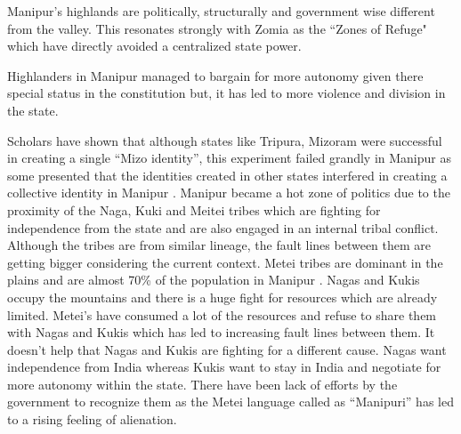 Manipur's highlands are politically, structurally and government wise different from the valley. This resonates strongly with Zomia as the ``Zones of Refuge" which have directly avoided a centralized state power.
\begin{sloppypar}

 Highlanders in Manipur managed to bargain for more autonomy given there special status in the constitution but, it has led to more violence and division in the state.
\end{sloppypar}
Scholars have shown that although states like Tripura, Mizoram were successful in creating a single \enquote{Mizo identity}, this experiment failed grandly in Manipur as some presented that the identities created in other states interfered in creating a collective identity in Manipur \citep{hassan2007state}. Manipur became a hot zone of politics due to the proximity of the Naga, Kuki and Meitei tribes which are fighting for independence from the state and are also engaged in an internal tribal conflict. Although the tribes are from similar lineage, the fault lines between them are getting bigger considering the current context. Metei tribes are dominant in the plains and are almost 70\% of the population in Manipur \citep{arora2012politics}. Nagas and Kukis occupy the mountains and there is a huge fight for resources which are already limited. Metei’s have consumed a lot of the resources and refuse to share them with Nagas and Kukis which has led to increasing fault lines between them. It doesn't help that Nagas and Kukis are fighting for a different cause. Nagas want independence from India whereas Kukis want to stay in India and negotiate for more autonomy within the state. There have been lack of efforts by the government to recognize them as the Metei language called as \enquote{Manipuri} has led to a rising feeling of alienation.

